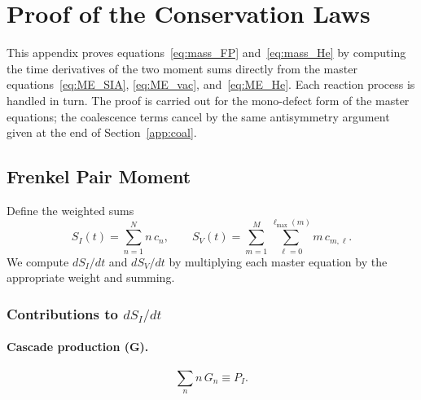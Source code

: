 \appendix
\section{Proof of the Conservation Laws}
\label{app:conservation}

This appendix proves equations~\eqref{eq:mass_FP} and~\eqref{eq:mass_He}
by computing the time derivatives of the two moment sums directly from the
master equations~\eqref{eq:ME_SIA}, \eqref{eq:ME_vac}, and~\eqref{eq:ME_He}.
Each reaction process is handled in turn. The proof is carried out for the
mono-defect form of the master equations; the coalescence terms cancel
by the same antisymmetry argument given at the end of
Section~\ref{app:coal}.

\subsection{Frenkel Pair Moment}
\label{app:FP}

Define the weighted sums
\begin{equation}\label{eq:SI_SV}
    S_I(t) = \sum_{n=1}^{N} n\,c_n,
    \qquad
    S_V(t) = \sum_{m=1}^{M}\sum_{\ell=0}^{\ell_{\max}(m)} m\,c_{m,\ell}.
\end{equation}
We compute $dS_I/dt$ and $dS_V/dt$ by multiplying each master equation by
the appropriate weight and summing.

\subsubsection*{Contributions to $dS_I/dt$}

\paragraph{Cascade production (G).}
\begin{equation}
    \sum_n n\,G_n \equiv P_I.
\end{equation}

